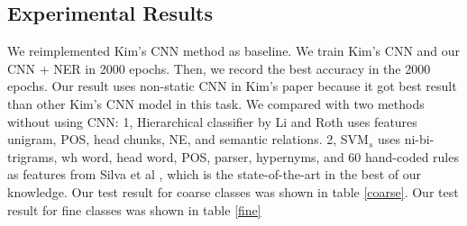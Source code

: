 \documentclass[10pt,twocolumn,letterpaper]{article}
\begin{document}
\subsection{Experimental Results}
We reimplemented Kim's CNN method as baseline. We train Kim's CNN and our CNN + NER in 2000 epochs. Then, we record the best accuracy in the 2000 epochs. Our result uses non-static CNN in Kim's paper because it got best result than other Kim's CNN model in this task. We compared with two methods without using CNN: 1, Hierarchical classifier by Li and Roth\cite{li2002learning} uses features unigram, POS, head chunks, NE, and semantic relations. 2, SVM$_s$ uses ni-bi-trigrams, wh word, head word, POS, parser, hypernyms, and 60 hand-coded rules as features from Silva et al \cite{silva2011symbolic}, which is the state-of-the-art in the best of our knowledge. Our test result for coarse classes was shown in table \ref{coarse}. Our test result for fine classes was shown in table \ref{fine}

\begin{table}
\caption{Top-1 and top-5 accuracy for TREC coarse question types. }
\label{coarse}
\end{table}

\begin{table}

\caption{Top-1 and top-5 accuracy for TREC coarse question types.}
\label{fine}
\end{table}
\end{document}
